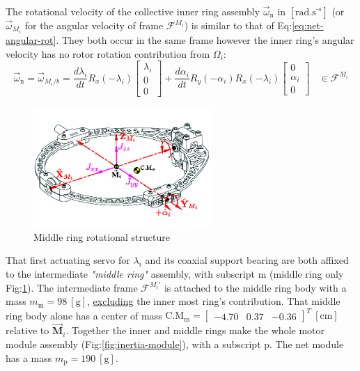 \par
The rotational velocity of the collective inner ring assembly $\vec{\omega}_\text{n}$ in $[\text{rad.s}^{\text{-}s}]$ (or $\vec{\omega}_{M_i}$ for the angular velocity of frame $\mathcal{F}^{M_i}$) is similar to that of Eq:\ref{eq:net-angular-rot}. They both occur in the same frame however the inner ring's angular velocity has no rotor rotation contribution from $\Omega_i$:
\begin{equation}\label{eq:net-angular-inner}
\vec{\omega}_\text{n}=\vec{\omega}_{M_i/b}=\frac{d\lambda_i}{dt}R_x(-\lambda_i)\begin{bmatrix}
\lambda_i\\
0\\
0
\end{bmatrix}
+\frac{d\alpha_i}{dt}R_y(-\alpha_i)R_x(-\lambda_i)\begin{bmatrix}
0\\
\alpha_i\\
0
\end{bmatrix}~~~~\in\mathcal{F}^{M_i}
\end{equation}
\par
\begin{figure}[htbp]
\vspace{-20pt}
\centering
\includegraphics[width=0.6\textwidth]{figs/inertia-middle}
\vspace{-18pt}
\caption{Middle ring rotational structure}
\label{fig:inertia-middle}
\vspace{-6pt}
\end{figure}
That first actuating servo for $\lambda_i$ and its coaxial support bearing are both affixed to the intermediate \emph{"middle ring"} assembly, with subscript m (middle ring only Fig:\ref{fig:inertia-middle}). The intermediate frame $\mathcal{F}^{M_i'}$ is attached to the middle ring body with a mass $m_\text{m}=98~[\text{g}]$, \underline{excluding} the inner most ring's contribution. That middle ring body alone has a center of mass $\text{C.M}_{\text{m}}=\begin{bmatrix}
-4.70&0.37&-0.36\end{bmatrix}^T~[\text{cm}]$ relative to $\vec{\mathbf{M}}_i$. Together the inner and middle rings make the whole motor module assembly (Fig:\ref{fig:inertia-module}), with a subscript p. The net module has a mass $m_\text{p}=190~[\text{g}]$. 

